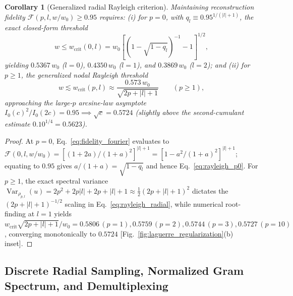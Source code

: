 \documentclass[aps,pra,onecolumn,notitlepage,11pt,tightenlines,amsmath,amssymb,floatfix,longbibliography]{revtex4-2}
\providecommand{\abs}[1]{\lvert#1\rvert}
\newtheorem{corollary}{Corollary}
\begin{document}
\begin{corollary}[Generalized radial Rayleigh criterion]
\label{cor:rayleigh_radial}
Maintaining reconstruction fidelity $\mathcal{F}(p,l,w/w_0) \ge 0.95$ requires: (i) for $p = 0$, with $q_l \equiv 0.95^{1/(\abs{l}+1)}$, the exact closed-form threshold
\begin{equation}
w \le w_{\mathrm{crit}}(0,l) = w_0 \left[\left(1 - \sqrt{1 - q_l}\right)^{-1} - 1\right]^{1/2},
\label{eq:rayleigh_p0}
\end{equation}
yielding $0.5367\,w_0$ ($l = 0$), $0.4350\,w_0$ ($l = 1$), and $0.3869\,w_0$ ($l = 2$); and (ii) for $p \ge 1$, the generalized nodal Rayleigh threshold
\begin{equation}
w \lesssim w_{\mathrm{crit}}(p,l) \approx \frac{0.573\,w_0}{\sqrt{2p + \abs{l} + 1}} \qquad (p \ge 1),
\label{eq:rayleigh_radial}
\end{equation}
approaching the large-$p$ arcsine-law asymptote $I_0(c)^2/I_0(2c) = 0.95 \implies \sqrt{c} = 0.5724$ (slightly above the second-cumulant estimate $0.10^{1/4} = 0.5623$).
\end{corollary}
\begin{proof}
At $p = 0$, Eq.~\eqref{eq:fidelity_fourier} evaluates to $\mathcal{F}(0,l,w/w_0) = [(1+2a)/(1+a)^2]^{\abs{l}+1} = [1 - a^2/(1+a)^2]^{\abs{l}+1}$; equating to $0.95$ gives $a/(1+a) = \sqrt{1 - q_l}$ and hence Eq.~\eqref{eq:rayleigh_p0}. For $p \ge 1$, the exact spectral variance $\operatorname{Var}_{\rho_{p,l}}(u) = 2p^2 + 2p\abs{l} + 2p + \abs{l} + 1 \approx \frac{1}{2}(2p+\abs{l}+1)^2$ dictates the $(2p+\abs{l}+1)^{-1/2}$ scaling in Eq.~\eqref{eq:rayleigh_radial}, while numerical root-finding at $l = 1$ yields $w_{\mathrm{crit}}\sqrt{2p+\abs{l}+1}/w_0 = 0.5806\,(p=1), 0.5759\,(p=2), 0.5744\,(p=3), 0.5727\,(p=10)$, converging monotonically to $0.5724$ [Fig.~\ref{fig:laguerre_regularization}(b) inset].
\end{proof}

\subsection{Discrete Radial Sampling, Normalized Gram Spectrum, and Demultiplexing}
\label{subsec:gram_sampling}
\end{document}
